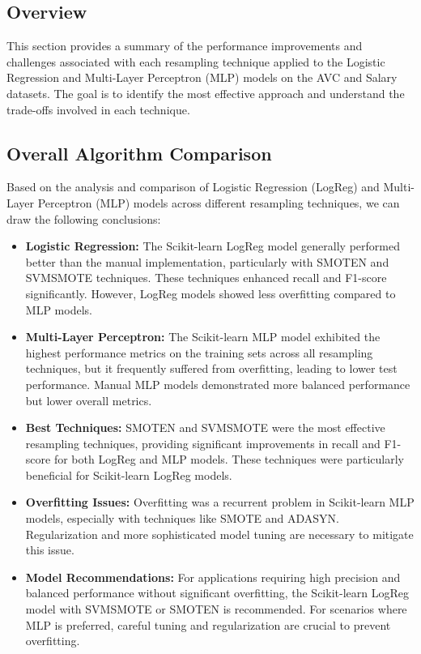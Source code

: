 \documentclass[a4paper,12pt]{article}
\begin{document}
\subsection{Overview}

This section provides a summary of the performance improvements and challenges associated with each resampling technique applied to the Logistic Regression and Multi-Layer Perceptron (MLP) models on the AVC and Salary datasets. The goal is to identify the most effective approach and understand the trade-offs involved in each technique.

\subsection{Overall Algorithm Comparison}

Based on the analysis and comparison of Logistic Regression (LogReg) and Multi-Layer Perceptron (MLP) models across different resampling techniques, we can draw the following conclusions:

\begin{itemize}
    \item \textbf{Logistic Regression:} The Scikit-learn LogReg model generally performed better than the manual implementation, particularly with SMOTEN and SVMSMOTE techniques. These techniques enhanced recall and F1-score significantly. However, LogReg models showed less overfitting compared to MLP models.
    \item \textbf{Multi-Layer Perceptron:} The Scikit-learn MLP model exhibited the highest performance metrics on the training sets across all resampling techniques, but it frequently suffered from overfitting, leading to lower test performance. Manual MLP models demonstrated more balanced performance but lower overall metrics.
    \item \textbf{Best Techniques:} SMOTEN and SVMSMOTE were the most effective resampling techniques, providing significant improvements in recall and F1-score for both LogReg and MLP models. These techniques were particularly beneficial for Scikit-learn LogReg models.
    \item \textbf{Overfitting Issues:} Overfitting was a recurrent problem in Scikit-learn MLP models, especially with techniques like SMOTE and ADASYN. Regularization and more sophisticated model tuning are necessary to mitigate this issue.
    \item \textbf{Model Recommendations:} For applications requiring high precision and balanced performance without significant overfitting, the Scikit-learn LogReg model with SVMSMOTE or SMOTEN is recommended. For scenarios where MLP is preferred, careful tuning and regularization are crucial to prevent overfitting.
\end{itemize}
\end{document}
